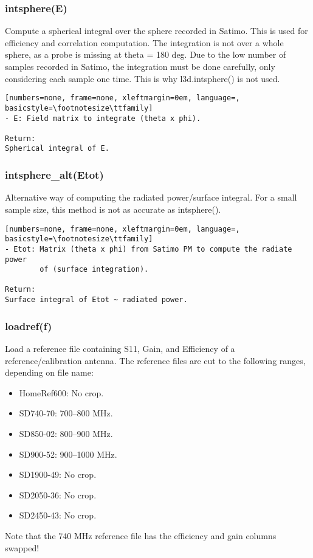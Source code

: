 \subsubsection{intsphere(E)}
Compute a spherical integral over the sphere recorded in Satimo. This is used
for efficiency and correlation computation. The integration is not over a
whole sphere, as a probe is missing at theta = 180 deg. Due to the low number
of samples recorded in Satimo, the integration must be done carefully, only
considering each sample one time. This is why l3d.intsphere() is not used.

\begin{lstlisting}[numbers=none, frame=none, xleftmargin=0em, language=, basicstyle=\footnotesize\ttfamily]
- E: Field matrix to integrate (theta x phi).

Return:
Spherical integral of E.
\end{lstlisting}

\subsubsection{intsphere\_alt(Etot)}
Alternative way of computing the radiated power/surface integral. For a small
sample size, this method is not as accurate as intsphere().

\begin{lstlisting}[numbers=none, frame=none, xleftmargin=0em, language=, basicstyle=\footnotesize\ttfamily]
- Etot: Matrix (theta x phi) from Satimo PM to compute the radiate power
        of (surface integration).

Return:
Surface integral of Etot ~ radiated power.
\end{lstlisting}

\subsubsection{loadref(f)}
Load a reference file containing S11, Gain, and Efficiency of a
reference/calibration antenna.
The reference files are cut to the following ranges, depending on file name:
\begin{itemize}
\item HomeRef600: No crop.
\item SD740-70: 700--800 MHz.
\item SD850-02: 800--900 MHz.
\item SD900-52: 900--1000 MHz.
\item SD1900-49: No crop.
\item SD2050-36: No crop.
\item SD2450-43: No crop.
\end{itemize}
Note that the 740 MHz reference file has the efficiency and gain columns
swapped!


